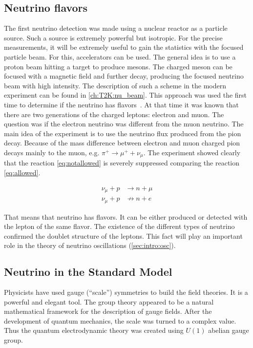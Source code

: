 \documentclass[../main.tex]{subfiles}
\begin{document}
\subsection{Neutrino flavors}
\label{sec:dublet}
The first neutrino detection was made using a nuclear reactor as a particle source. Such a source is extremely powerful but isotropic. For the precise measurements, it will be extremely useful to gain the statistics with the focused particle beam. For this, accelerators can be used. The general idea is to use a proton beam hitting a target to produce mesons. The charged meson can be focused with a magnetic field and further decay, producing the focused neutrino beam with high intensity. The description of such a scheme in the modern experiment can be found in \autoref{ch:T2K:nu_beam}. This approach was used the first time to determine if the neutrino has flavors~\cite{Danby1962}. At that time it was known that there are two generations of the charged leptons: electron and muon. The question was if the electron neutrino was different from the muon neutrino. The main idea of the experiment is to use the neutrino flux produced from the pion decay. Because of the mass difference between electron and muon charged pion decays mainly to the muon, e.g. $\pi^+\to\mu^++\nu_\mu$. The experiment showed clearly that the reaction \autoref{eq:notallowed} is severely suppressed comparing the reaction \autoref{eq:allowed}.

\begin{align}
\label{eq:allowed}
\nu_\mu+p&\rightarrow n+\mu \\
\nu_\mu+p&\nrightarrow n+e
\label{eq:notallowed}
\end{align}

That means that neutrino has flavors. It can be either produced or detected with the lepton of the same flavor. The existence of the different types of neutrino confirmed the doublet structure of the leptons. This fact will play an important role in the theory of neutrino oscillations (\autoref{sec:intro:osc}).

\subsection{Neutrino in the Standard Model}
\label{sec:sm}

Physicists have used gauge (``scale'') symmetries to build the field theories. It is a powerful and elegant tool. The group theory appeared to be a natural mathematical framework for the description of gauge fields. After the development of quantum mechanics, the scale was turned to a complex value. Thus the quantum electrodynamic theory was created using $U(1)$ abelian gauge group.
\end{document}
